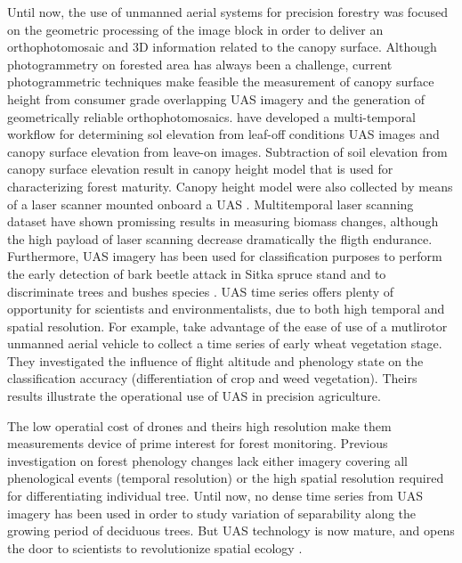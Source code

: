 \documentclass[remotesensing,article,submit,moreauthors,pdftex,12pt,a4paper]{mdpi} %
\begin{document}
Until now, the use of unmanned aerial systems for precision forestry was focused on the geometric processing of the image block in order to deliver an orthophotomosaic and 3D information related to the canopy surface. 
Although photogrammetry on forested area has always been a challenge, current photogrammetric techniques make feasible the measurement of canopy surface height from consumer grade overlapping UAS imagery and the generation of geometrically reliable orthophotomosaics. 
\citeauthor{dandois_high_2013} \cite{dandois_high_2013} have developed a multi-temporal workflow for determining sol elevation from leaf-off conditions UAS images and canopy surface elevation from leave-on images. 
Subtraction of soil elevation from canopy surface elevation result in canopy height model that is used for characterizing forest maturity. 
Canopy height model were also collected by means of a laser scanner mounted onboard a UAS \cite{jaakkola_low-cost_2010}. 
Multitemporal laser scanning dataset have shown promissing results in measuring biomass changes, although the high payload of laser scanning decrease dramatically the fligth endurance.
Furthermore, UAS imagery has been used for classification purposes to perform the early detection of bark beetle attack in Sitka spruce stand \cite{drauschke_towards_2014} and to discriminate trees and bushes species \cite{gini_use_2014}. 
UAS time series offers plenty of opportunity for scientists and environmentalists, due to both high temporal and spatial resolution. 
For example, \citeauthor{torres-sanchez_multi-temporal_2014} \cite{torres-sanchez_multi-temporal_2014} take advantage of the ease of use of a mutlirotor unmanned aerial vehicle to collect a time series of early wheat vegetation stage. 
They investigated the influence of flight altitude and phenology state on the classification accuracy (differentiation of crop and weed vegetation).
Theirs results illustrate the operational use of UAS in precision agriculture. 

The low operatial cost of drones and theirs high resolution make them measurements device of prime interest for forest monitoring. 
Previous investigation on forest phenology changes lack either imagery covering all phenological events (temporal resolution) or the high spatial resolution required for differentiating individual tree.
Until now, no dense time series from UAS imagery has been used in order to study variation of separability along the growing period of deciduous trees.
But UAS technology is now mature, and opens the door to scientists to revolutionize spatial ecology \cite{anderson_lightweight_2013}.
\end{document}
